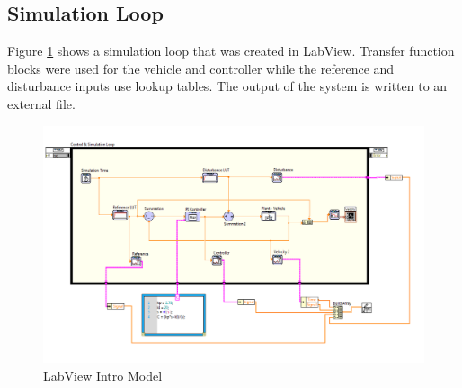 \documentclass[11pt,titlepage]{article}
\begin{document}
	\subsection{Simulation Loop}
		Figure \ref{fig:sim_intro} shows a simulation loop that was created in LabView. Transfer function blocks were used for the vehicle and controller while the reference and disturbance inputs use lookup tables. The output of the system is written to an external file.
		\begin{figure}[h!]
			\centering
			\includegraphics[scale=.5]{labviewIntro}
			\caption{LabView Intro Model}
			\label{fig:sim_intro}
		\end{figure}
\end{document}
